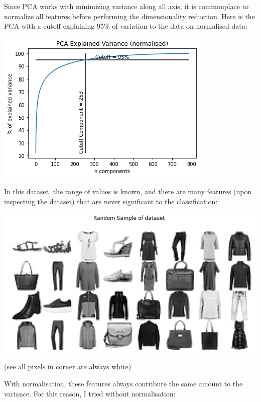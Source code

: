\documentclass[11pt]{article}
\begin{document}
Since PCA works with minimizing variance along all axis, it is commonplace to normalize all features before performing the dimensionality reduction. Here is the PCA with a cutoff explaining 95\% of variation to the data on normalised data:
\begin{center}
\includegraphics[width=.9\linewidth]{.images/Experimentation_and_Results/2020-10-21_20-25-19_screenshot.png}
\end{center}

In this dataset, the range of values is known, and there are many features (upon inspecting the dataset) that are never significant to the classification:

\begin{center}
\includegraphics[width=.9\linewidth]{.images/Experimentation_and_Results/2020-10-21_20-29-28_screenshot.png}
\end{center}

(see all pixels in corner are always white)

With normalisation, these features always contribute the same amount to the variance. For this reason, I tried without normalisation:
\end{document}
